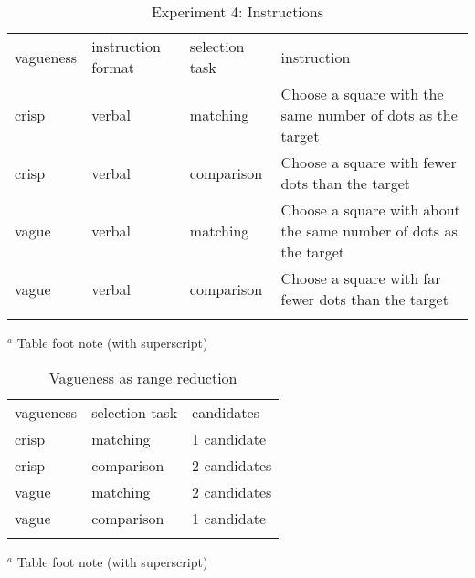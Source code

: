 \begin{table}
\caption{Experiment 4: Instructions}
\label{instructionse4}
\begin{tabular}{llll}
\hline\noalign{\smallskip}
vagueness&instruction format& selection task&instruction\\
\noalign{\smallskip}\svhline\noalign{\smallskip}
crisp 	& verbal	&matching 	& Choose a square with the same number of dots as the target \\ 
crisp 	& verbal	&comparison	& Choose a square with fewer dots than the target \\
vague 	& verbal	&matching 	& Choose a square with about the same number of dots as the target \\ 
vague 	& verbal	&comparison	& Choose a square with far fewer dots than the target \\ 
\noalign{\smallskip}\hline\noalign{\smallskip}
\end{tabular}
$^a$ Table foot note (with superscript)\\
\end{table}


\begin{table}
\caption{Vagueness as range reduction}
\label{vaguenessasrangereduction} 
\begin{tabular}{lll}
\hline\noalign{\smallskip}
vagueness & selection task & candidates\\
\noalign{\smallskip}\svhline\noalign{\smallskip}
crisp 	& matching 	& 1 candidate\\
crisp 	& comparison 	& 2 candidates\\
vague 	& matching 	& 2 candidates\\
vague 	& comparison 	& 1 candidate\\
\noalign{\smallskip}\hline\noalign{\smallskip}
\end{tabular}
$^a$ Table foot note (with superscript)\\
\end{table}



